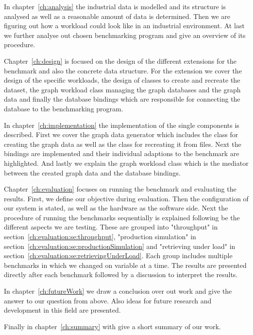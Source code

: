 In chapter~\ref{ch:analysis} the industrial data is modelled and its structure is analysed as well as a reasonable amount of data is determined.
Then we are figuring out how a workload could look like in an industrial environment.
At last we further analyse out chosen benchmarking program and give an overview of its procedure.

Chapter~\ref{ch:design} is focused on the design of the different extensions for the benchmark and also the concrete data structure.
For the extension we cover the design of the specific workloads,
the design of classes to create and recreate the dataset,
the graph workload class managing the graph databases and the graph data and finally the database bindings which are responsible for connecting the database to the benchmarking program.

In chapter~\ref{ch:implementation} the implementation of the single components is described.
First we cover the graph data generator which includes the class for creating the graph data as well as the class for recreating it from files.
Next the bindings are implemented and their individual adaptions to the benchmark are highlighted.
And lastly we explain the graph workload class which is the mediator between the created graph data and the database bindings.

Chapter~\ref{ch:evaluation} focuses on running the benchmark and evaluating the results.
First, we define our objective during evaluation.
Then the configuration of our system is stated, as well as the hardware as the software side.
Next the procedure of running the benchmarks sequentially is explained following be the different aspects we are testing.
These are grouped into "throughput" in section~\ref{ch:evaluation:se:throughput}, "production simulation" in section~\ref{ch:evaluation:se:productionSimulation} and "retrieving under load" in section~\ref{ch:evaluation:se:retrievingUnderLoad}.
Each group includes multiple benchmarks in which we changed on variable at a time.
The results are presented directly after each benchmark followed by a discussion to interpret the results.

In chapter~\ref{ch:futureWork} we draw a conclusion over out work and give the answer to our question from above.
Also ideas for future research and development in this field are presented.

Finally in chapter~\ref{ch:summary} with give a short summary of our work.
